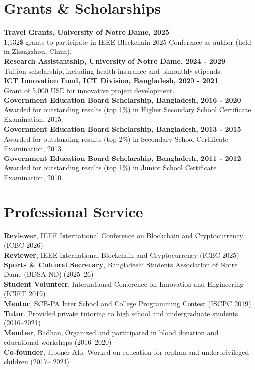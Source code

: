 \documentclass{academic-cv}
\begin{document}
\section{Grants \& Scholarships}
\textbf{Travel Grants, University of Notre Dame, 2025}\\
1,132\$ grants to participate in IEEE Blockchain 2025 Conference as author (held in Zhengzhou, China).\\[0.3em]
\textbf{Research Assistantship, University of Notre Dame, 2024 - 2029}\\
Tuition scholarship, including health insurance and bimonthly stipends.\\[0.3em]
\textbf{ICT Innovation Fund, ICT Division, Bangladesh, 2020 - 2021}\\
Grant of 5,000 USD for innovative project development.\\[0.3em]
\textbf{Government Education Board Scholarship, Bangladesh, 2016 - 2020}\\
Awarded for outstanding results (top 1\%) in Higher Secondary School Certificate Examination, 2015.\\[0.3em]
\textbf{Government Education Board Scholarship, Bangladesh, 2013 - 2015}\\
Awarded for outstanding results (top 2\%) in Secondary School Certificate Examination, 2013.\\[0.3em]
\textbf{Government Education Board Scholarship, Bangladesh, 2011 - 2012}\\
Awarded for outstanding results (top 1\%) in Junior School Certificate Examination, 2010.

\section{Professional Service}
\textbf{Reviewer}, IEEE International Conference on Blockchain and Cryptocurrency (ICBC 2026)\\
\textbf{Reviewer}, IEEE International Blockchain and Cryptocurrency (ICBC 2025)\\
\textbf{Sports \& Cultural Secretary}, Bangladeshi Students Association of Notre Dame (BDSA-ND) (2025--26)\\
\textbf{Student Volunteer}, International Conference on Innovation and Engineering (ICIET 2019)\\
\textbf{Mentor}, SCB-PA Inter School and College Programming Contest (ISCPC 2019)\\
\textbf{Tutor}, Provided private tutoring to high school and undergraduate students (2016--2021) \\
\textbf{Member}, Badhan, Organized and participated in blood donation and educational workshops (2016--2020) \\
\textbf{Co-founder}, Jiboner Alo, Worked on education for orphan and underprivileged children (2017-- 2024)
\end{document}
